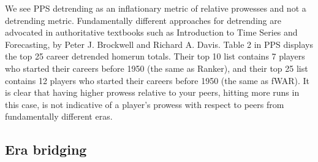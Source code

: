 \documentclass[11pt]{article}\usepackage[]{graphicx}\usepackage[]{color}
\begin{document}
We see PPS detrending as an inflationary metric of relative prowesses 
and not a detrending metric.  
Fundamentally different approaches for detrending are advocated in 
authoritative textbooks such as 
 Introduction to Time Series and Forecasting,
   by
 Peter J. Brockwell and Richard A. Davis.
Table 2 in PPS displays the top 25 career detrended homerun totals.  Their 
top 10 list contains 7 players who started their careers before 1950 
(the same as Ranker), and their 
top 25 list contains 12 players who started their careers before 1950 
(the same as fWAR).
It is clear that having higher prowess relative to your peers, hitting more 
runs in this case, is not indicative of a player's prowess with respect to 
peers from fundamentally different eras.  



\subsection{Era bridging}
\end{document}
